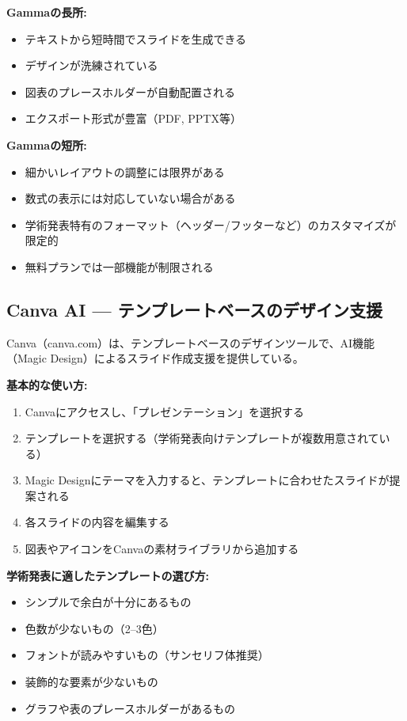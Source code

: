 \textbf{Gammaの長所:}
\begin{itemize}
\item テキストから短時間でスライドを生成できる
\item デザインが洗練されている
\item 図表のプレースホルダーが自動配置される
\item エクスポート形式が豊富（PDF, PPTX等）
\end{itemize}

\textbf{Gammaの短所:}
\begin{itemize}
\item 細かいレイアウトの調整には限界がある
\item 数式の表示には対応していない場合がある
\item 学術発表特有のフォーマット（ヘッダー/フッターなど）のカスタマイズが限定的
\item 無料プランでは一部機能が制限される
\end{itemize}

\subsection{Canva AI --- テンプレートベースのデザイン支援}

Canva（canva.com）は、テンプレートベースのデザインツールで、AI機能（Magic Design）によるスライド作成支援を提供している。

\textbf{基本的な使い方:}

\begin{enumerate}
\item Canvaにアクセスし、「プレゼンテーション」を選択する
\item テンプレートを選択する（学術発表向けテンプレートが複数用意されている）
\item Magic Designにテーマを入力すると、テンプレートに合わせたスライドが提案される
\item 各スライドの内容を編集する
\item 図表やアイコンをCanvaの素材ライブラリから追加する
\end{enumerate}

\textbf{学術発表に適したテンプレートの選び方:}

\begin{itemize}
\item シンプルで余白が十分にあるもの
\item 色数が少ないもの（2--3色）
\item フォントが読みやすいもの（サンセリフ体推奨）
\item 装飾的な要素が少ないもの
\item グラフや表のプレースホルダーがあるもの
\end{itemize}

